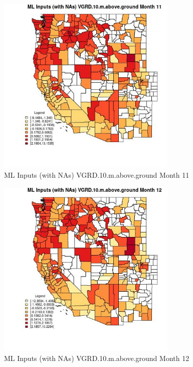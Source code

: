 \begin{figure} 
\centering  
\includegraphics[width=0.77\textwidth]{Code_Outputs/Report_ML_input_PM25_Step4_part_e_de_duplicated_aves_compiled_2019-05-21wNAs_CountyVGRD10mabovegroundmedianMonth11.jpg} 
\caption{\label{fig:Report_ML_input_PM25_Step4_part_e_de_duplicated_aves_compiled_2019-05-21wNAsCountyVGRD10mabovegroundmedianMonth11}ML Inputs (with NAs) VGRD.10.m.above.ground Month 11} 
\end{figure} 
 

\begin{figure} 
\centering  
\includegraphics[width=0.77\textwidth]{Code_Outputs/Report_ML_input_PM25_Step4_part_e_de_duplicated_aves_compiled_2019-05-21wNAs_CountyVGRD10mabovegroundmedianMonth12.jpg} 
\caption{\label{fig:Report_ML_input_PM25_Step4_part_e_de_duplicated_aves_compiled_2019-05-21wNAsCountyVGRD10mabovegroundmedianMonth12}ML Inputs (with NAs) VGRD.10.m.above.ground Month 12} 
\end{figure} 
 

